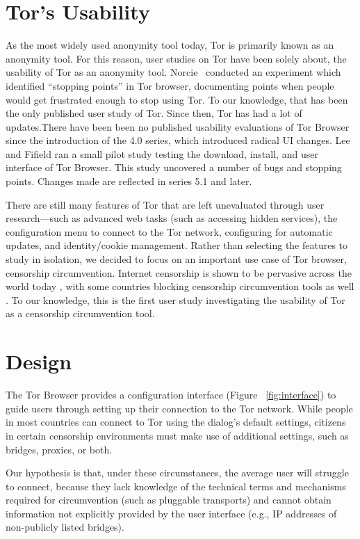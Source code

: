 \documentclass{template}
\begin{document}
\section{Tor's Usability}
As the most widely used anonymity tool today, Tor is primarily known as an anonymity tool. 
For this reason, user studies on Tor have been solely about, the usability of Tor as an 
anonymity tool. Norcie~\cite{norcie2012eliminating} conducted an experiment which identified 
``stopping points'' in Tor browser,  documenting points when people would get frustrated enough 
to stop using Tor. To our knowledge, that has been the only published user study of Tor. 
Since then, Tor has had a lot of updates.There have been been no published usability evaluations of
Tor Browser since the introduction of the 4.0 series, which introduced radical UI changes. 
Lee and Fifield \cite {uxsprint} ran a small pilot study testing the download, install, and user interface of Tor Browser. 
This study uncovered a number of bugs and stopping points. Changes made are reflected in series 
5.1 and later. 

There are still many features of Tor that are left unevaluated through user research---such as advanced web tasks (such as accessing hidden services), the configuration menu to connect to the Tor network, configuring for automatic updates, and identity/cookie management. Rather than selecting the features to study in isolation, 
we decided to focus on an important use case of Tor browser, censorship circumvention. 
Internet censorship is shown to be pervasive across the world today \cite{faris2008measuring}, with 
some countries blocking censorship circumvention tools as well \cite{winter2012great}. 
To our knowledge, this is the first user study investigating the usability of Tor as a 
censorship circumvention tool.

\section{Design}

The Tor Browser provides a configuration interface (Figure
~\ref{fig:interface}) to guide users through setting up their connection to the
Tor network. While people in most countries can connect to Tor using the
dialog's default settings, citizens in certain censorship environments must
make use of additional settings, such as bridges, proxies, or both.

Our hypothesis is that, under these circumstances, the average user will
struggle to connect, because they lack knowledge of the technical terms and
mechanisms required for circumvention (such as pluggable transports) and cannot
obtain information not explicitly provided by the user interface (e.g., IP
addresses of non-publicly listed bridges).
\end{document}
